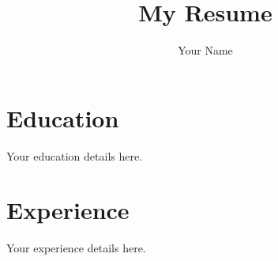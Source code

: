 \documentclass{article}
\begin{document}
\title{My Resume}
\author{Your Name}
\maketitle

\section{Education}
Your education details here.

\section{Experience}
Your experience details here.
\end{document}

